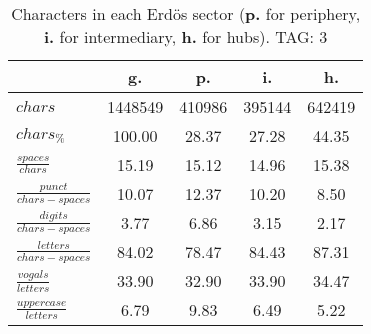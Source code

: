 \begin{table}[h!]
\begin{center}
\begin{tabular}{| l || c | c | c | c |}\hline
 & {\bf g.} & {\bf p.} & {\bf i.} & {\bf h.} \\\hline\hline
$chars$ & 1448549  & 410986  & 395144  & 642419 \\
$chars_{\%}$ & 100.00  & 28.37  & 27.28  & 44.35 \\\hline
$\frac{spaces}{chars}$ & 15.19  & 15.12  & 14.96  & 15.38 \\
$\frac{punct}{chars-spaces}$ & 10.07  & 12.37  & 10.20  & 8.50 \\
$\frac{digits}{chars-spaces}$ & 3.77  & 6.86  & 3.15  & 2.17 \\\hline
$\frac{letters}{chars-spaces}$ & 84.02  & 78.47  & 84.43  & 87.31 \\
$\frac{vogals}{letters}$ & 33.90  & 32.90  & 33.90  & 34.47 \\
$\frac{uppercase}{letters}$ & 6.79  & 9.83  & 6.49  & 5.22 \\\hline
\end{tabular}
\caption{Characters in each Erd\"os sector ({{\bf p.}} for periphery, {{\bf i.}} for intermediary, 
    {{\bf h.}} for hubs). TAG: 3}
\end{center}
\end{table}